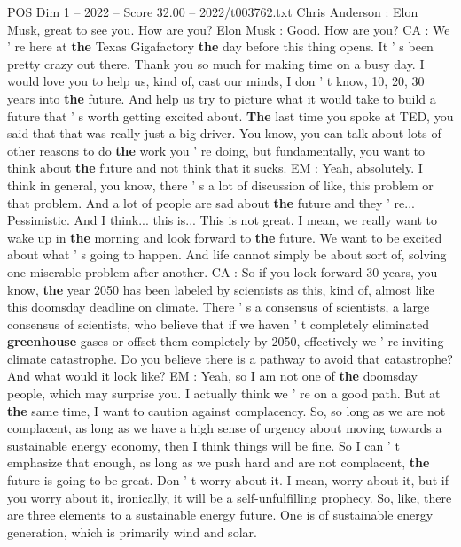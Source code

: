 \begin{textsample}{POS Dim 1 – 2022 – Score 32.00 – 2022/t003762.txt}  \label{ex:f1_pos_069}
Chris Anderson : Elon Musk, great to see you.
How are you?
Elon Musk : Good.
How are you?
CA : We ' re here at \textbf{the} Texas Gigafactory \textbf{the} day before this thing opens.
It ' s been pretty crazy out there.
Thank you so much for making time on a busy day.
I would love you to help us, kind of, cast our minds, I don ' t know, 10, 20, 30 years into \textbf{the} future.
And help us try to picture what it would take to build a future that ' s worth getting excited about. \textbf{The} last time you spoke at TED, you said that that was really just a big driver.
You know, you can talk about lots of other reasons to do \textbf{the} work you ' re doing, but fundamentally, you want to think about \textbf{the} future and not think that it sucks.
EM : Yeah, absolutely.
I think in general, you know, there ' s a lot of discussion of like, this problem or that problem.
And a lot of people are sad about \textbf{the} future and they ' re...
Pessimistic.
And I think... this is...
This is not great.
I mean, we really want to wake up in \textbf{the} morning and look forward to \textbf{the} future.
We want to be excited about what ' s going to happen.
And life cannot simply be about sort of, solving one miserable problem after another.
CA : So if you look forward 30 years, you know, \textbf{the} year 2050 has been labeled by scientists as this, kind of, almost like this doomsday deadline on climate.
There ' s a consensus of scientists, a large consensus of scientists, who believe that if we haven ' t completely eliminated \textbf{greenhouse} gases or offset them completely by 2050, effectively we ' re inviting climate catastrophe.
Do you believe there is a pathway to avoid that catastrophe?
And what would it look like?
EM : Yeah, so I am not one of \textbf{the} doomsday people, which may surprise you.
I actually think we ' re on a good path.
But at \textbf{the} same time, I want to caution against complacency.
So, so long as we are not complacent, as long as we have a high sense of urgency about moving towards a sustainable energy economy, then I think things will be fine.
So I can ' t emphasize that enough, as long as we push hard and are not complacent, \textbf{the} future is going to be great.
Don ' t worry about it.
I mean, worry about it, but if you worry about it, ironically, it will be a self-unfulfilling prophecy.
So, like, there are three elements to a sustainable energy future.
One is of sustainable energy generation, which is primarily wind and solar.

\end{textsample}
